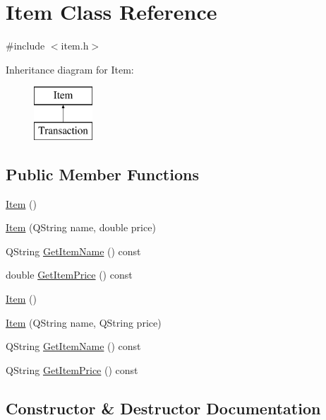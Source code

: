 \hypertarget{class_item}{}\section{Item Class Reference}
\label{class_item}


{\ttfamily \#include $<$item.\+h$>$}

Inheritance diagram for Item\+:\begin{figure}[H]
\begin{center}
\leavevmode
\includegraphics[height=2.000000cm]{class_item}
\end{center}
\end{figure}
\subsection*{Public Member Functions}
\begin{DoxyCompactItemize}
\item 
\hyperlink{class_item_a297720c02984eab37332ae795d22189d}{Item} ()
\item 
\hyperlink{class_item_a53775715216c52abe8b935716fe2f9c0}{Item} (Q\+String name, double price)
\item 
Q\+String \hyperlink{class_item_a2d931852889fde95b3555b0fedbffc09}{Get\+Item\+Name} () const
\item 
double \hyperlink{class_item_a402405e399d9fa866090a90931817c1d}{Get\+Item\+Price} () const
\item 
\hyperlink{class_item_a297720c02984eab37332ae795d22189d}{Item} ()
\item 
\hyperlink{class_item_a6cfc53bbd2fd57070674ba1ba684688f}{Item} (Q\+String name, Q\+String price)
\item 
Q\+String \hyperlink{class_item_a2d931852889fde95b3555b0fedbffc09}{Get\+Item\+Name} () const
\item 
Q\+String \hyperlink{class_item_abbd1fb42824998cccdaae1bc7adbf353}{Get\+Item\+Price} () const
\end{DoxyCompactItemize}


\subsection{Constructor \& Destructor Documentation}
\mbox{\label{class_item_a297720c02984eab37332ae795d22189d}} 
